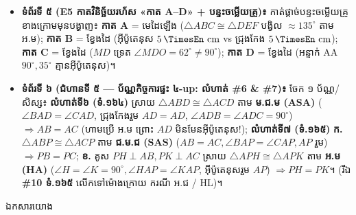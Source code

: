 \documentclass[a4paper,12pt]{article}
\newcommand{\en}[1]{{\TimesEn #1}}
\newcommand{\unit}[1]{\,\text{\en{#1}}}
\newcommand{\tri}[1]{\ensuremath{\triangle #1}}
\newcommand{\ang}[1]{\ensuremath{\angle #1}}
\newcommand{\cg}{\ensuremath{\cong}}
\newcommand{\refbanner}[1]{%
  \needspace{2.2cm}%
  \vspace{2pt}%
  \begin{tcolorbox}[
    enhanced, sharp corners, colback=panelgray, colframe=black,
    boxrule=0.85pt, left=9pt, right=9pt, top=6pt, bottom=6pt,
    before skip=6pt, after skip=5pt
  ]
    {\muol\fontsize{12pt}{19pt}\selectfont #1}%
  \end{tcolorbox}%
}
\begin{document}
\begin{itemize}[leftmargin=0.55cm, topsep=1pt, itemsep=1.0pt, parsep=0pt]
  \item \textbf{ទំព័រទី ៥ (\en{E5} កាតវិនិច្ឆ័យរហ័ស «កាត \en{A--D}» + បន្ទះចម្លើយគ្រូ)៖}
    កាត់ផ្ដាច់បន្ទះចម្លើយគ្រូខាងក្រោមមុនបង្ហាញ៖ \textbf{កាត \en{A}} = មេដៃឡើង  ($\tri{ABC}\cg\tri{DEF}$ បង្វិល $\approx 135^\circ$ តាម អ.ម); \textbf{កាត \en{B}} = ខ្វែងដៃ  (អ៊ីប៉ូតេនុស $5\unit{cm}$ vs ជ្រុងកែង $5\unit{cm}$); \textbf{កាត \en{C}} = ខ្វែងដៃ  ($MD$ ទ្រេត $\ang{MDO}=62^\circ \neq 90^\circ$); \textbf{កាត \en{D}} = ខ្វែងដៃ  (អន្ទាក់ \en{AA} $90^\circ, 35^\circ$ គ្មានអ៊ីប៉ូតេនុស)។
  \item \textbf{ទំព័រទី ៦ (ជំហានទី ៥ — ប័ណ្ណកិច្ចការផ្ទះ ៤-up: លំហាត់ \#6 \& \#7)៖}
    ចែក ១ ប័ណ្ណ/សិស្ស៖ \textbf{លំហាត់ទី៦ (ទំ.១៦៤)} ស្រាយ $\tri{ABD}\cg\tri{ACD}$ តាម \textbf{ម.ជ.ម (\en{ASA})} ($\ang{BAD}=\ang{CAD}$, ជ្រុងកែងរួម $AD=AD$, $\ang{ADB}=\ang{ADC}=90^\circ$) $\Rightarrow AB=AC$ (ហាមប្រើ អ.ម ព្រោះ $AD$ មិនមែនអ៊ីប៉ូតេនុស!); \textbf{លំហាត់ទី៧ (ទំ.១៦៥)} \textbf{ក.} $\tri{ABP}\cg\tri{ACP}$ តាម \textbf{ជ.ម.ជ (\en{SAS})} ($AB=AC, \ang{BAP}=\ang{CAP}, AP$ រួម) $\Rightarrow PB=PC$; \textbf{ខ.} គូស $PH\perp AB, PK\perp AC$ ស្រាយ $\tri{APH}\cg\tri{APK}$ តាម \textbf{អ.ម (\en{HA})} ($\ang{H}=\ang{K}=90^\circ, \ang{HAP}=\ang{KAP}$, អ៊ីប៉ូតេនុសរួម $AP$) $\Rightarrow PH=PK$។ (រីឯ \textbf{\#10 ទំ.១៦៥} លើកទៅម៉ោងក្រោយ ករណី អ.ជ / \en{HL})។
\end{itemize}

\refbanner{ឯកសារយោង}
\end{document}
